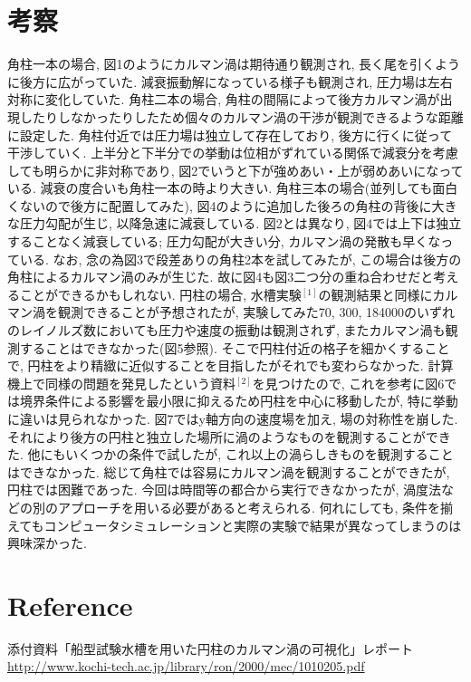 \documentclass[12pt]{jsarticle}
\begin{document}
\section{考察} 
角柱一本の場合, 図1のようにカルマン渦は期待通り観測され, 長く尾を引くように後方に広がっていた. 減衰振動解になっている様子も観測され, 圧力場は左右対称に変化していた. \newline\indent
角柱二本の場合, 角柱の間隔によって後方カルマン渦が出現したりしなかったりしたため個々のカルマン渦の干渉が観測できるような距離に設定した. 角柱付近では圧力場は独立して存在しており, 後方に行くに従って干渉していく. 上半分と下半分での挙動は位相がずれている関係で減衰分を考慮しても明らかに非対称であり, 図2でいうと下が強めあい・上が弱めあいになっている. 減衰の度合いも角柱一本の時より大きい. \newline\indent
角柱三本の場合(並列しても面白くないので後方に配置してみた), 図4のように追加した後ろの角柱の背後に大きな圧力勾配が生じ, 以降急速に減衰している. 図2とは異なり, 図4では上下は独立することなく減衰している; 圧力勾配が大きい分, カルマン渦の発散も早くなっている. なお, 念の為図3で段差ありの角柱2本を試してみたが, この場合は後方の角柱によるカルマン渦のみが生じた. 故に図4も図3二つ分の重ね合わせだと考えることができるかもしれない. \newline\indent
円柱の場合, 水槽実験$^{[1]}$の観測結果と同様にカルマン渦を観測できることが予想されたが, 実験してみた70, 300, 184000のいずれのレイノルズ数においても圧力や速度の振動は観測されず, またカルマン渦も観測することはできなかった(図5参照). そこで円柱付近の格子を細かくすることで, 円柱をより精緻に近似することを目指したがそれでも変わらなかった. 計算機上で同様の問題を発見したという資料$^{[2]}$を見つけたので, これを参考に図6では境界条件による影響を最小限に抑えるため円柱を中心に移動したが, 特に挙動に違いは見られなかった. 図7ではy軸方向の速度場を加え, 場の対称性を崩した. それにより後方の円柱と独立した場所に渦のようなものを観測することができた. 他にもいくつかの条件で試したが, これ以上の渦らしきものを観測することはできなかった.\newline\indent
総じて角柱では容易にカルマン渦を観測することができたが, 円柱では困難であった. 今回は時間等の都合から実行できなかったが, 渦度法などの別のアプローチを用いる必要があると考えられる. 何れにしても, 条件を揃えてもコンピュータシミュレーションと実際の実験で結果が異なってしまうのは興味深かった.
\section{Reference} \noindent
[1] 添付資料「船型試験水槽を用いた円柱のカルマン渦の可視化」レポート \newline
[2] \url{http://www.kochi-tech.ac.jp/library/ron/2000/mec/1010205.pdf}
\end{document}
